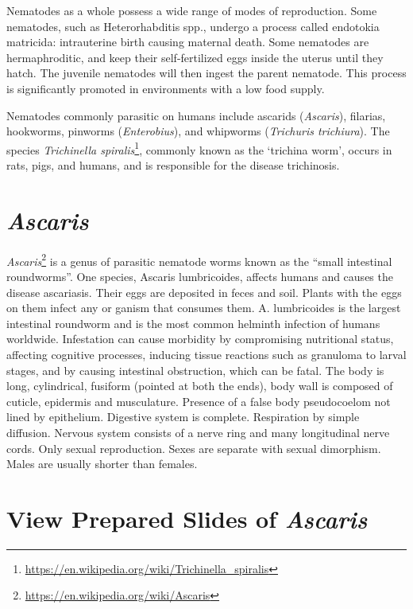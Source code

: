 \documentclass[]{book}
\let\rmarkdownfootnote\footnote%
\def\footnote{\protect\rmarkdownfootnote}
\renewcommand{\href}[2]{#2\footnote{\url{#1}}}
\theoremstyle{definition}
\theoremstyle{definition}
\theoremstyle{definition}
\theoremstyle{remark}
\begin{document}
Nematodes as a whole possess a wide range of modes of reproduction. Some
nematodes, such as Heterorhabditis spp., undergo a process called
endotokia matricida: intrauterine birth causing maternal death. Some
nematodes are hermaphroditic, and keep their self-fertilized eggs inside
the uterus until they hatch. The juvenile nematodes will then ingest the
parent nematode. This process is significantly promoted in environments
with a low food supply.

Nematodes commonly parasitic on humans include ascarids
(\emph{Ascaris}), filarias, hookworms, pinworms (\emph{Enterobius}), and
whipworms (\emph{Trichuris trichiura}). The species
\href{https://en.wikipedia.org/wiki/Trichinella_spiralis}{\emph{Trichinella
spiralis}}, commonly known as the `trichina worm', occurs in rats, pigs,
and humans, and is responsible for the disease trichinosis.

\section{\texorpdfstring{\emph{Ascaris}}{Ascaris}}\label{ascaris}

\href{https://en.wikipedia.org/wiki/Ascaris}{\emph{Ascaris}} is a genus
of parasitic nematode worms known as the ``small intestinal
roundworms''. One species, Ascaris lumbricoides, affects humans and
causes the disease ascariasis. Their eggs are deposited in feces and
soil. Plants with the eggs on them infect any or ganism that consumes
them. A. lumbricoides is the largest intestinal roundworm and is the
most common helminth infection of humans worldwide. Infestation can
cause morbidity by compromising nutritional status, affecting cognitive
processes, inducing tissue reactions such as granuloma to larval stages,
and by causing intestinal obstruction, which can be fatal. The body is
long, cylindrical, fusiform (pointed at both the ends), body wall is
composed of cuticle, epidermis and musculature. Presence of a false body
pseudocoelom not lined by epithelium. Digestive system is complete.
Respiration by simple diffusion. Nervous system consists of a nerve ring
and many longitudinal nerve cords. Only sexual reproduction. Sexes are
separate with sexual dimorphism. Males are usually shorter than females.

\section{\texorpdfstring{View Prepared Slides of
\emph{Ascaris}}{View Prepared Slides of Ascaris}}\label{view-prepared-slides-of-ascaris}
\end{document}
